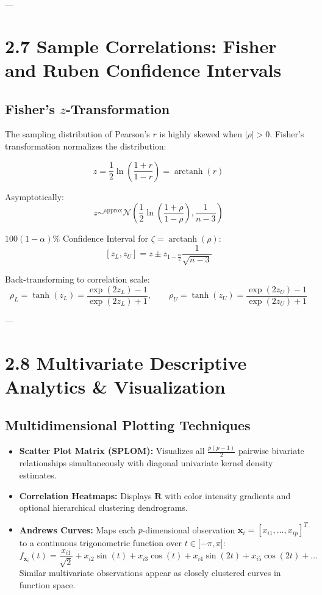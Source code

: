 \documentclass[
]{article}
\begin{document}
---

\textbf{ }

\section{2.7 Sample Correlations: Fisher and Ruben Confidence Intervals}

\textbf{ }

\subsection{\texorpdfstring{Fisher's
\(z\)-Transformation}{Fisher's z-Transformation}}

The sampling distribution of Pearson's \(r\) is highly skewed when
\(|\rho| > 0\). Fisher's transformation normalizes the distribution:

\[z = \frac{1}{2}\ln(\frac{1 + r}{1 - r}) = \operatorname{arctanh}(r)\]

Asymptotically:
\[z \sim^{\text{approx}}\mathcal{N}(\frac{1}{2}\ln(\frac{1 + \rho}{1 - \rho}),\frac{1}{n - 3})\]

\(100(1 - \alpha)\%\) Confidence Interval for
\(\zeta = \operatorname{arctanh}(\rho)\):
\[\left\lbrack z_{L},z_{U} \right\rbrack = z \pm z_{1 - \frac{\alpha}{2}}\frac{1}{\sqrt{n - 3}}\]

Back-transforming to correlation scale:
\[\rho_{L} = \tanh(z_{L}) = \frac{\exp(2z_{L}) - 1}{\exp(2z_{L}) + 1},\quad\quad\rho_{U} = \tanh(z_{U}) = \frac{\exp(2z_{U}) - 1}{\exp(2z_{U}) + 1}\]

---

\textbf{ }

\section{2.8 Multivariate Descriptive Analytics \& Visualization}

\textbf{ }

\subsection{Multidimensional Plotting Techniques}

\begin{itemize}
\item
  \textbf{Scatter Plot Matrix (SPLOM):} Visualizes all
  \(\frac{p(p - 1)}{2}\) pairwise bivariate relationships simultaneously
  with diagonal univariate kernel density estimates.
\item
  \textbf{Correlation Heatmaps:} Displays \(\mathbf{R}\) with color
  intensity gradients and optional hierarchical clustering dendrograms.
\item
  \textbf{Andrews Curves:} Maps each \(p\)-dimensional observation
  \(\mathbf{x}_{i} = \left\lbrack x_{i1},\ldots,x_{ip} \right\rbrack^{T}\)
  to a continuous trigonometric function over
  \(t \in \lbrack - \pi,\pi\rbrack\):
  \[f_{\mathbf{x}_{i}}(t) = \frac{x_{i1}}{\sqrt{2}} + x_{i2}\sin(t) + x_{i3}\cos(t) + x_{i4}\sin(2t) + x_{i5}\cos(2t) + \ldots\]
  Similar multivariate observations appear as closely clustered curves
  in function space.
\end{itemize}
\end{document}
